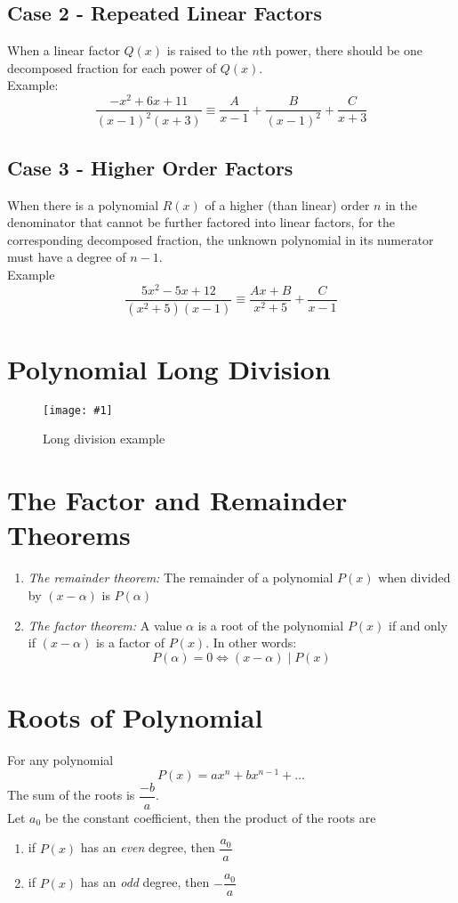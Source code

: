 \documentclass[11pt]{article}
\newcommand{\lb}{\\[8pt]}
\newcommand{\img}[3]{\begin{center}
  \begin{figure}[H]
    \centering
    \texttt{[image: \#1]}
    \caption{#3}
    \label{fig:fig1}
  \end{figure}
\end{center}}
\begin{document}
\subsection{Case 2 - Repeated Linear Factors}

When a linear factor $Q(x)$ is raised to the $n$th power, there should be one decomposed fraction for each power of $Q(x)$.\lb
Example:
$$\frac{-x^2 + 6x +11}{(x - 1)^2 (x+3)} \equiv \frac{A}{x - 1} + \frac{B}{(x - 1)^2} + \frac{C}{x + 3} $$


\subsection{Case 3 - Higher Order Factors}

When there is a polynomial $R(x)$ of a higher (than linear) order $n$ in the denominator that cannot be further factored into linear factors, for the corresponding decomposed fraction, the unknown polynomial in its numerator must have a degree of $n-1$.\lb
Example
$$\frac{5x^2 -5x + 12}{(x^2 + 5)(x-1)} \equiv \frac{Ax + B}{x^2 + 5} +\frac{C}{x - 1}$$

\pagebreak

\section{Polynomial Long Division}

\img{longdiv.png}{0.6}{Long division example}

\section{The Factor and Remainder Theorems}

\begin{enumerate}
  \item
        \textit{The remainder theorem:} The remainder of a polynomial $P(x)$ when divided by $(x - \alpha)$ is $P(\alpha)$

  \item \textit{The factor theorem:} A value $\alpha$ is a root of the polynomial $P(x)$ if and only if $(x - \alpha)$ is a factor of $P(x)$. In other words:
        $$P(\alpha) = 0 \iff (x - \alpha) \mid P(x)$$
\end{enumerate}

\pagebreak

\section{Roots of Polynomial}

For any polynomial $$P(x) = ax^n + bx^{n - 1} + ... $$
The sum of the roots is $\dfrac{-b}{a}$.\lb
Let $a_{0}$ be the constant coefficient, then the product of the roots are
\begin{enumerate}
  \item if $P(x)$ has an \textit{even} degree, then $\dfrac{a_{0}}{a}$
  \item if $P(x)$ has an \textit{odd} degree, then $-\dfrac{a_{0}}{a}$
\end{enumerate}
\end{document}
